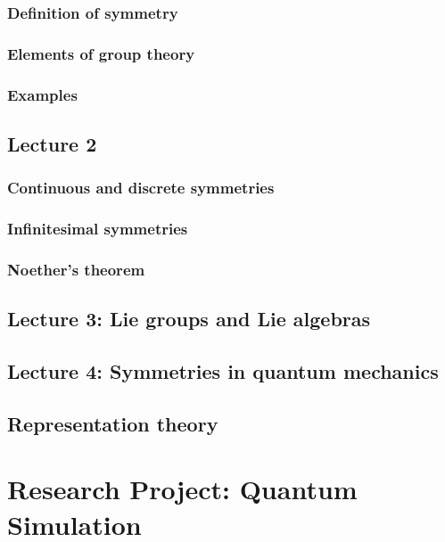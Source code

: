 \documentclass{book}
\theoremstyle{definition}
\begin{document}
\subsection{Definition of symmetry}
\newpage
\subsection{Elements of group theory}
\newpage
\subsection{Examples }
\newpage



\section{Lecture 2}
\subsection{Continuous and discrete symmetries}
\newpage
\subsection{Infinitesimal symmetries}
\newpage
\subsection{Noether's theorem}


\newpage

\section{Lecture 3: Lie groups and Lie algebras}
\newpage

\section{Lecture 4: Symmetries in quantum mechanics}
\newpage
\section{Representation theory}



\newpage



\chapter{Research Project: Quantum Simulation}
\end{document}
